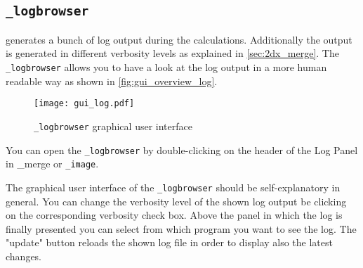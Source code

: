 \newpage
\subsection{{\twodx}\texttt{\_logbrowser}}
{\twodx} generates a bunch of log output during the calculations. Additionally the output is generated in different verbosity levels as explained in \autoref{sec:2dx_merge}. The {\twodx}\texttt{\_logbrowser} allows you to have a look at the log output in a more human readable way as shown in \autoref{fig:gui_overview_log}. 

\begin{figure}[H]
	\centering
	\texttt{[image: gui\_log.pdf]}
	\caption{{\twodx}\texttt{\_logbrowser} graphical user interface}
	\label{fig:gui_overview_log}
\end{figure}

You can open the {\twodx}\texttt{\_logbrowser} by double-clicking on the header of the Log Panel in {\twodx}{\_merge} or {\twodx}\texttt{\_image}.

The graphical user interface of the {\twodx}\texttt{\_logbrowser} should be self-explanatory in general. You can change the verbosity level of the shown log output be clicking on the corresponding verbosity check box. Above the panel in which the log is finally presented you can select from which program you want to see the log. The "update" button reloads the shown log file in order to display also the latest changes.